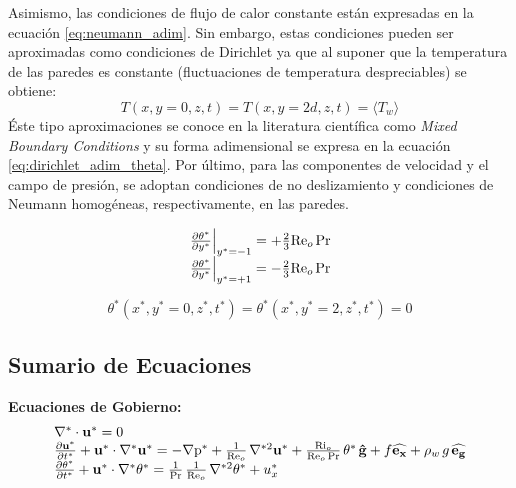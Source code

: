 Asimismo, las condiciones de flujo de calor constante están expresadas en la ecuación \ref{eq:neumann_adim}. Sin embargo, estas condiciones pueden ser aproximadas como condiciones de Dirichlet ya que al suponer que la temperatura de las paredes es constante (fluctuaciones de temperatura despreciables) se obtiene: 
$$T(x,y=0,z,t) = T(x,y=2d,z,t) = \langle T_w \rangle$$ 
Éste tipo aproximaciones se conoce en la literatura científica como \textit{Mixed Boundary Conditions} \cite{straub2019influence} y su forma adimensional se expresa en la ecuación \ref{eq:dirichlet_adim_theta}. Por último, para las componentes de velocidad y el campo de presión, se adoptan condiciones de no deslizamiento y condiciones de Neumann homogéneas, respectivamente, en las paredes. 

\begin{align}
\begin{array}{l}
    \left. \frac{\partial \theta^*}{\partial y^*} \right\vert_{y^*=-1} = + \frac{2}{3} \text{Re}_o \hspace{0.5mm} \text{Pr} \\
    \left. \frac{\partial \theta^*}{\partial y^*} \right\vert_{y^*=+1} = - \frac{2}{3} \text{Re}_o \hspace{0.5mm} \text{Pr} 
\end{array}
\label{eq:neumann_adim}
\end{align}

\begin{equation}
\theta^*(x^*,y^*=0,z^*,t^*) = \theta^*(x^*,y^*=2,z^*,t^*) = 0
\label{eq:dirichlet_adim_theta}
\end{equation}



\subsection{Sumario de Ecuaciones}

\textbf{Ecuaciones de Gobierno:}
\begin{equation}
\begin{array}{l}
    \nabla^* \cdot \mathbf{u^*} = 0 \\
    \frac{\partial \mathbf{u^*}}{\partial t^*} + \mathbf{u^*} \cdot \nabla^* \mathbf{u^*} = 
    -\nabla \text{p}^* + \frac{1}{\text{Re}_o} \hspace{0.5mm} \nabla^{*2} \mathbf{u^*} + \frac{\text{Ri}_o}{\text{Re}_o \hspace{0.5mm} \text{Pr}} \hspace{0.5mm} \theta^* \hspace{0.5mm} \mathbf{\hat{g}} + f \mathbf{\widehat{e_x}} + \rho_w \hspace{0.5mm} g \hspace{0.5mm} \mathbf{\widehat{e_g}} \\
    \frac{\partial \theta^*}{\partial t^*} + \mathbf{u^*} \cdot \nabla^* \theta^* = 
    \frac{1}{\text{Pr}}\hspace{0.5mm}  \frac{1}{\text{Re}_o} \hspace{0.5mm} \nabla^{*2} \theta^* + u_x^* 
\end{array}
\label{eq:gob_system_res1}
\end{equation}


